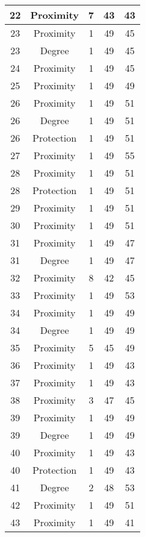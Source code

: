 \documentclass[results.tex]{subfiles}
\begin{document}
\begin{center}
\begin{tabular}{| c || c | c | c | c |}
    \hline
    22 & Proximity & 7 & 43 & 43 \\ 
    \hline
    23 & Proximity & 1 & 49 & 45 \\ 
    \hline
    23 & Degree & 1 & 49 & 45 \\ 
    \hline
    24 & Proximity & 1 & 49 & 45 \\ 
    \hline
    25 & Proximity & 1 & 49 & 49 \\ 
    \hline
    26 & Proximity & 1 & 49 & 51 \\ 
    \hline
    26 & Degree & 1 & 49 & 51 \\ 
    \hline
    26 & Protection & 1 & 49 & 51 \\ 
    \hline
    27 & Proximity & 1 & 49 & 55 \\ 
    \hline
    28 & Proximity & 1 & 49 & 51 \\ 
    \hline
    28 & Protection & 1 & 49 & 51 \\ 
    \hline
    29 & Proximity & 1 & 49 & 51 \\ 
    \hline
    30 & Proximity & 1 & 49 & 51 \\ 
    \hline
    31 & Proximity & 1 & 49 & 47 \\ 
    \hline
    31 & Degree & 1 & 49 & 47 \\ 
    \hline
    32 & Proximity & 8 & 42 & 45 \\ 
    \hline
    33 & Proximity & 1 & 49 & 53 \\ 
    \hline
    34 & Proximity & 1 & 49 & 49 \\ 
    \hline
    34 & Degree & 1 & 49 & 49 \\ 
    \hline
    35 & Proximity & 5 & 45 & 49 \\ 
    \hline
    36 & Proximity & 1 & 49 & 43 \\ 
    \hline
    37 & Proximity & 1 & 49 & 43 \\ 
    \hline
    38 & Proximity & 3 & 47 & 45 \\ 
    \hline
    39 & Proximity & 1 & 49 & 49 \\ 
    \hline
    39 & Degree & 1 & 49 & 49 \\ 
    \hline
    40 & Proximity & 1 & 49 & 43 \\ 
    \hline
    40 & Protection & 1 & 49 & 43 \\ 
    \hline
    41 & Degree & 2 & 48 & 53 \\ 
    \hline
    42 & Proximity & 1 & 49 & 51 \\ 
    \hline
    43 & Proximity & 1 & 49 & 41 \\ 

\end{tabular}
\end{center}
\end{document}
